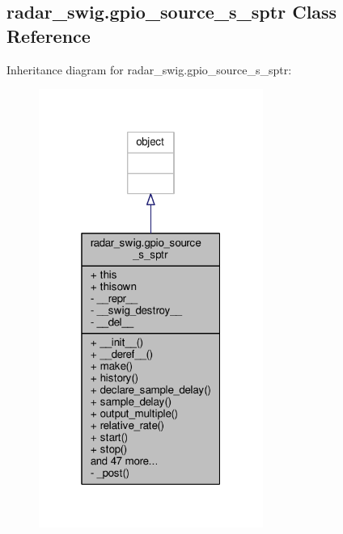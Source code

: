\subsection{radar\+\_\+swig.\+gpio\+\_\+source\+\_\+s\+\_\+sptr Class Reference}
\label{classradar__swig_1_1gpio__source__s__sptr}


Inheritance diagram for radar\+\_\+swig.\+gpio\+\_\+source\+\_\+s\+\_\+sptr\+:
\nopagebreak
\begin{figure}[H]
\begin{center}
\leavevmode
\includegraphics[width=208pt]{db/d0a/classradar__swig_1_1gpio__source__s__sptr__inherit__graph}
\end{center}
\end{figure}



